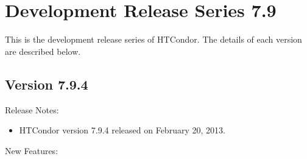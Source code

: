 
\section{\label{sec:History-7-9}Development Release Series 7.9}

This is the development release series of HTCondor.
The details of each version are described below.

\subsection*{\label{sec:New-7-9-4}Version 7.9.4}

\noindent Release Notes:

\begin{itemize}

\item HTCondor version 7.9.4 released on February 20, 2013.

\end{itemize}


\noindent New Features:

